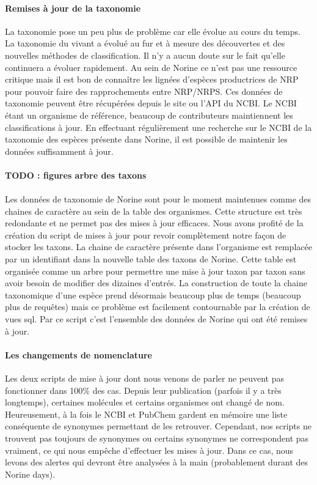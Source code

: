 \documentclass[12pt,french,twoside]{report}
\begin{document}
\paragraph{Remises à jour de la taxonomie}
La taxonomie pose un peu plus de problème car elle évolue au cours du temps.
La taxonomie du vivant a évolué au fur et à mesure des découvertes et des nouvelles méthodes de classification.
Il n'y a aucun doute sur le fait qu'elle continuera a évoluer rapidement.
Au sein de Norine ce n'est pas une ressource critique mais il est bon de connaître les lignées d'espèces productrices de NRP pour pouvoir faire des rapprochements entre NRP/NRPS.
Ces données de taxonomie peuvent être récupérées depuis le site ou l'API du NCBI.
Le NCBI étant un organisme de référence, beaucoup de contributeurs maintiennent les classifications à jour.
En effectuant régulièrement une recherche sur le NCBI de la taxonomie des espèces présente dans Norine, il est possible de maintenir les données suffisamment à jour.

\paragraph{TODO : figures arbre des taxons}

\paragraph{}Les données de taxonomie de Norine sont pour le moment maintenues comme des chaines de caractère au sein de la table des organismes.
Cette structure est très redondante et ne permet pas des mises à jour efficaces.
Nous avons profité de la création du script de mises à jour pour revoir complètement notre façon de stocker les taxons.
La chaine de caractère présente dans l'organisme est remplacée par un identifiant dans la nouvelle table des taxons de Norine.
Cette table est organisée comme un arbre pour permettre une mise à jour taxon par taxon sans avoir besoin de modifier des dizaines d'entrés.
La construction de toute la chaine taxonomique d'une espèce prend désormais beaucoup plus de temps (beaucoup plus de requêtes) mais ce problème est facilement contournable par la création de vues sql.
Par ce script c'est l'ensemble des données de Norine qui ont été remises à jour.


\paragraph{Les changements de nomenclature}
Les deux scripts de mise à jour dont nous venons de parler ne peuvent pas fonctionner dans 100\% des cas.
Depuis leur publication (parfois il y a très longtemps), certaines molécules et certains organismes ont changé de nom.
Heureusement, à la fois le NCBI et PubChem gardent en mémoire une liste conséquente de synonymes permettant de les retrouver.
Cependant, nos scripts ne trouvent pas toujours de synonymes ou certains synonymes ne correspondent pas vraiment, ce qui nous empêche d'effectuer les mises à jour.
Dans ce cas, nous levons des alertes qui devront être analysées à la main (probablement durant des Norine days).
\end{document}
